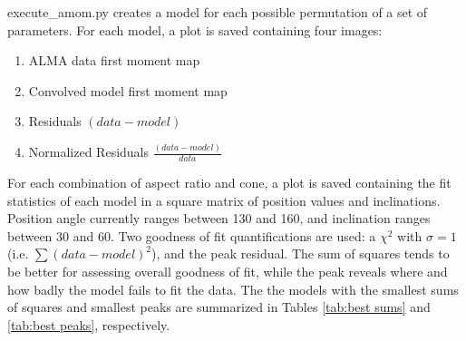 \documentclass[a4paper]{tufte-handout}
\begin{document}
execute\_amom.py creates a model for each possible permutation of a set of parameters. For each model, a plot is saved containing four images:
\begin{enumerate}
  \item ALMA data first moment map
  \item Convolved model first moment map
  \item Residuals $(data-model)$
  \item Normalized Residuals $\frac{(data-model)}{data}$
\end{enumerate}

For each combination of aspect ratio and cone, a plot is saved containing the fit statistics of each model in a square matrix of position values and inclinations. Position angle currently ranges between 130 and 160, and inclination ranges between 30 and 60. Two goodness of fit quantifications are used: a $\chi^2$ with $\sigma=1$ (i.e. $\sum(data-model)^2$), and the peak residual. The sum of squares tends to be better for assessing overall goodness of fit, while the peak reveals where and how badly the model fails to fit the data.  The the models with the smallest sums of squares and smallest peaks are summarized in Tables \ref{tab:best sums} and \ref{tab:best peaks}, respectively.
\end{document}
